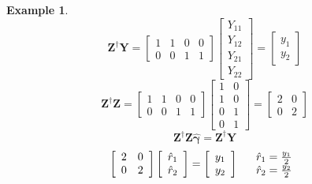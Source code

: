 \documentclass{article}
\newtheorem{example}[theorem]{Example}
\begin{document}
\begin{example}
\begin{equation*}
\mathbf{Z}^{\dagger }\mathbf{Y=}\left[ 
\begin{array}{cccc}
1 & 1 & 0 & 0 \\ 
0 & 0 & 1 & 1%
\end{array}%
\right] \left[ 
\begin{array}{c}
Y_{11} \\ 
Y_{12} \\ 
Y_{21} \\ 
Y_{22}%
\end{array}%
\right] =\left[ 
\begin{array}{c}
y_{1} \\ 
y_{2}%
\end{array}%
\right]
\end{equation*}%
\begin{equation*}
\mathbf{Z}^{\dagger }\mathbf{Z=}\left[ 
\begin{array}{cccc}
1 & 1 & 0 & 0 \\ 
0 & 0 & 1 & 1%
\end{array}%
\right] \left[ 
\begin{array}{cc}
1 & 0 \\ 
1 & 0 \\ 
0 & 1 \\ 
0 & 1%
\end{array}%
\right] =\left[ 
\begin{array}{cc}
2 & 0 \\ 
0 & 2%
\end{array}%
\right]
\end{equation*}%
\begin{equation*}
\mathbf{Z}^{\dagger }\mathbf{Z\hat{\gamma}=Z}^{\dagger }\mathbf{Y}
\end{equation*}%
\begin{equation*}
\left[ 
\begin{array}{cc}
2 & 0 \\ 
0 & 2%
\end{array}%
\right] \left[ 
\begin{array}{c}
\hat{r}_{1} \\ 
\hat{r}_{2}%
\end{array}%
\right] =\left[ 
\begin{array}{c}
y_{1} \\ 
y_{2}%
\end{array}%
\right] \quad 
\begin{tabular}{l}
$\hat{r}_{1}=\frac{y_{1}}{2}$ \\ 
$\hat{r}_{2}=\frac{y_{2}}{2}$%
\end{tabular}%
\end{equation*}
\end{example}
\end{document}
